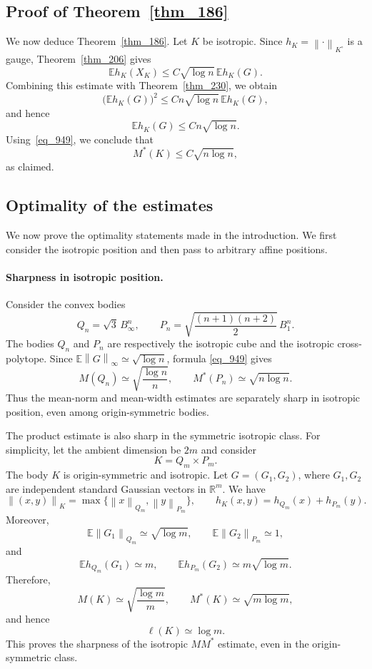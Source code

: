 \documentclass[12pt]{article}
\theoremstyle{definition}
\theoremstyle{remark}
\newcommand{\R}{\mathbb R}
\newcommand{\E}{\mathbb E}
\newcommand{\norm}[1]{\left\lVert #1\right\rVert}
\begin{document}
\subsection{Proof of Theorem~\ref{thm_186}}

We now deduce Theorem~\ref{thm_186}. Let $K$ be isotropic. Since
$h_K=\norm{\cdot}_{K^\circ}$ is a gauge,
Theorem~\ref{thm_206} gives
\[
  \E h_K(X_K)
  \leq C\sqrt{\log n}\,\E h_K(G).
\]
Combining this estimate with Theorem~\ref{thm_230}, we obtain
\[
  \bigl(\E h_K(G)\bigr)^2
  \leq Cn\sqrt{\log n}\,\E h_K(G),
\]
and hence
\[
  \E h_K(G)\leq Cn\sqrt{\log n}.
\]
Using~\eqref{eq_949}, we conclude that
\[
  M^*(K)\leq C\sqrt{n\log n},
\]
as claimed.

\subsection{Optimality of the estimates}\label{sec_1045}

We now prove the optimality statements made in the introduction. We first
consider the isotropic position and then pass to arbitrary affine positions.

\paragraph{Sharpness in isotropic position.}
Consider the convex bodies
\[
  Q_n=\sqrt3\,B_\infty^n,
  \qquad
  P_n=\sqrt{\frac{(n+1)(n+2)}2}\,B_1^n.
\]
The bodies $Q_n$ and $P_n$ are respectively the isotropic cube and the
isotropic cross-polytope. Since
$\E\norm{G}_\infty\simeq\sqrt{\log n}$, formula
\eqref{eq_949} gives
\begin{equation}\label{eq_1061}
  M(Q_n)
  \simeq\sqrt{\frac{\log n}{n}},
  \qquad
  M^*(P_n)
  \simeq\sqrt{n\log n}.
\end{equation}
Thus the mean-norm and mean-width estimates are separately sharp in
isotropic position, even among origin-symmetric bodies.

The product estimate is also sharp in the symmetric isotropic class. For
simplicity, let the ambient dimension be $2m$ and consider
\[
  K=Q_m\times P_m.
\]
The body $K$ is origin-symmetric and isotropic. Let
$G=(G_1,G_2)$, where $G_1,G_2$ are independent standard Gaussian vectors
in $\R^m$. We have
\[
  \norm{(x,y)}_K
  =\max\{\norm{x}_{Q_m},\norm{y}_{P_m}\},
  \qquad
  h_K(x,y)=h_{Q_m}(x)+h_{P_m}(y).
\]
Moreover,
\[
  \E\norm{G_1}_{Q_m}\simeq\sqrt{\log m},
  \qquad
  \E\norm{G_2}_{P_m}\simeq1,
\]
and
\[
  \E h_{Q_m}(G_1)\simeq m,
  \qquad
  \E h_{P_m}(G_2)\simeq m\sqrt{\log m}.
\]
Therefore,
\[
  M(K)\simeq\sqrt{\frac{\log m}{m}},
  \qquad
  M^*(K)\simeq\sqrt{m\log m},
\]
and hence
\begin{equation}\label{eq_1104}
  \ell(K)\simeq\log m.
\end{equation}
This proves the sharpness of the isotropic $MM^*$ estimate, even in the
origin-symmetric class.
\end{document}
